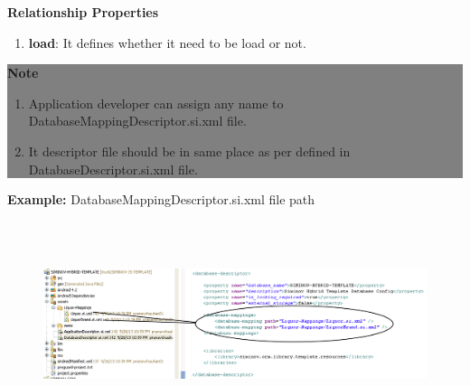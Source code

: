 \begin{enumerate}
\begin{enumerate}
		\end{enumerate}

		\textbf{Relationship Properties}

		\begin{enumerate}

			\item \small \textbf{load}: It defines whether it need to be load or not.
			
		\end{enumerate}
		
\end{enumerate}

\newpage
\begin{center}
		\colorbox{grey}{
			\parbox[t]{.8\linewidth}{
				\fontsize{11pt}{11pt}\selectfont %
				\vspace*{0.1cm} %
		
				\hfill \textbf{Note} \\

				\hfill 

				\begin{enumerate}

					\item \small Application developer can assign any name to DatabaseMappingDescriptor.si.xml file.

					\item \small It descriptor file should be in same place as per defined in DatabaseDescriptor.si.xml file.
	
				\end{enumerate}

				\vspace*{0.0cm} %
			}
		}

\end{center}

		\par
		\textbf{Example:} DatabaseMappingDescriptor.si.xml file path
		\begin{figure}[htbp]
			\centering
				\includegraphics[height=6cm]{Resources/siminov_hybrid_template_database_descriptor_mapping_path_example.png}
		\end{figure}


